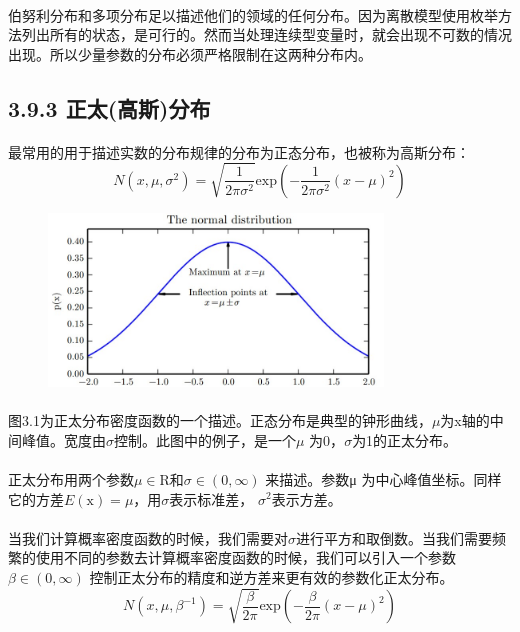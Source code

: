 \documentclass{article}
\begin{document}
    \paragraph{}
    伯努利分布和多项分布足以描述他们的领域的任何分布。因为离散模型使用枚举方法列出所有的状态，是可行的。然而当处理连续型变量时，就会出现不可数的情况出现。所以少量参数的分布必须严格限制在这两种分布内。
    \subsection*{3.9.3 正太(高斯)分布}
    \paragraph{}
    最常用的用于描述实数的分布规律的分布为正态分布，也被称为高斯分布：
    \begin{equation}
      N(x,\mu,\sigma^{2})=\sqrt{\frac{1}{2\pi\sigma^{2}}}\mathrm{exp}(-\frac{1}{2\pi\sigma^{2}}(x-\mu)^{2})  \tag{3.21}
    \end{equation}
   \begin{figure}[!htb]
    \centering
   \centerline{\includegraphics[width=3.5in]{fig/chap3/3_1.jpg}}
   \label*{图:3.1}
   \end{figure}
   \paragraph{}
    图3.1为正太分布密度函数的一个描述。正态分布是典型的钟形曲线，$\mu$为x轴的中间峰值。宽度由$\sigma$控制。此图中的例子，是一个$\mu$ 为0，$\sigma$为1的正太分布。
    \paragraph{}
    正太分布用两个参数$\mu\in \mathrm{R}$和$ \sigma\in (0,\infty)$ 来描述。参数μ 为中心峰值坐标。同样它的方差$E(\mathrm{x})= \mu$，用$\sigma$表示标准差， $\sigma^{2}$表示方差。
    \paragraph{}
    当我们计算概率密度函数的时候，我们需要对$\sigma$进行平方和取倒数。当我们需要频繁的使用不同的参数去计算概率密度函数的时候，我们可以引入一个参数$\beta\in (0,\infty)$ 控制正太分布的精度和逆方差来更有效的参数化正太分布。
   \begin{equation}
      N(x,\mu,\beta^{-1})=\sqrt{\frac{\beta}{2\pi}}\mathrm{exp}(-\frac{\beta}{2\pi}(x-\mu)^{2})  \tag{3.22}
    \end{equation}
\end{document}
